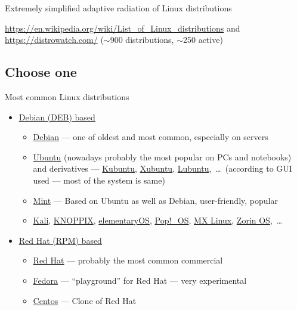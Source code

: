 \documentclass[compress, xelatex, 11pt, xcolor=svgnames, aspectratio=169,
	hyperref={
		bookmarks=true,
		unicode=true,
		colorlinks=true,
		pdftitle={Linux, command line and MetaCentrum},
		plainpages=false,
		pdfauthor={Vojtech Zeisek},
		pdfsubject={Course about use of Linux command line, writing shell scripts and using MetaCentrum of CESNET},
		pdfcreator={XeLaTeX},
		pdfkeywords={Linux, GNU, BASH, shell, command line, MetaCentrum},
		linkcolor=DarkRed, %
		anchorcolor=DarkBlue, %
		citecolor=Indigo, %
		filecolor=NavyBlue, %
		menucolor=DarkMagenta, %
		urlcolor=DarkBlue, %
		},
	url={hyphens, lowtilde} %
	]{beamer}
\renewcommand{\texttt}[1]{\colorbox{Beige}{{\ttfamily #1}}}
\begin{document}
\begin{frame}{Extremely simplified adaptive radiation of Linux distributions}
	\begin{center}
		\texttt{[image: linux\_fylogen\_2.png]}
	\end{center}
	\vfil
	\url{https://en.wikipedia.org/wiki/List_of_Linux_distributions} and \url{https://distrowatch.com/} ($\sim$900 distributions, $\sim$250 active)
	\vfill
\end{frame}

\subsection{Choose one}

\begin{frame}{Most common Linux distributions}
	\begin{itemize}
		\item \href{https://distrowatch.com/search.php?package=DEB}{Debian (DEB) based}
		\begin{itemize}
			\item \href{https://www.debian.org/}{Debian} --- one of oldest and most common, especially on servers
			\item \href{https://ubuntu.com/}{Ubuntu} (nowadays probably the most popular on PCs and notebooks) and derivatives --- \href{https://kubuntu.org/}{Kubuntu}, \href{https://xubuntu.org/}{Xubuntu}, \href{https://lubuntu.me/}{Lubuntu},~\ldots~(according to GUI used --- most of the system is same)
			\item \href{https://linuxmint.com/}{Mint} --- Based on Ubuntu as well as Debian, user-friendly, popular
			\item \href{https://www.kali.org/}{Kali}, \href{https://knopper.net/knoppix/index-en.html}{KNOPPIX}, \href{https://elementary.io/}{elementaryOS}, \href{https://pop.system76.com/}{Pop!\_OS}, \href{https://mxlinux.org/}{MX Linux}, \href{https://zorin.com/os/}{Zorin OS},~\ldots
		\end{itemize}
		\item \href{https://distrowatch.com/search.php?package=RPM}{Red Hat (RPM) based}
		\begin{itemize}
			\item \href{https://www.redhat.com/}{Red Hat} --- probably the most common commercial
			\item \href{https://fedoraproject.org/}{Fedora} --- \enquote{playground} for Red Hat --- very experimental
			\item \href{https://www.centos.org/}{Centos} --- Clone of Red Hat

\end{itemize}
\end{itemize}
\end{frame}
\end{document}
